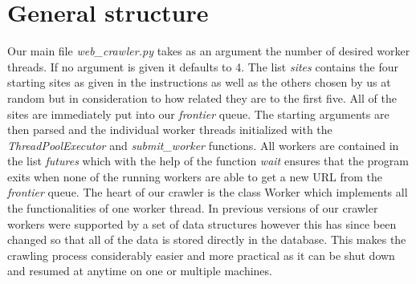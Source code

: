 \documentclass[runningheads]{llncs}
\begin{document}
\section{General structure}
Our main file \textit{web\_crawler.py} takes as an argument the number of desired worker threads. If no argument is given it defaults to 4. The list \textit{sites} contains the four starting sites as given in the instructions as well as the others chosen by us at random but in consideration to how related they are to the first five. All of the sites are immediately put into our \textit{frontier} queue. The starting arguments are then parsed and the individual worker threads initialized with the \textit{ThreadPoolExecutor} and \textit{submit\_worker} functions. All workers are contained in the list \textit{futures} which with the help of the function \textit{wait} ensures that the program exits when none of the running workers are able to get a new URL from the \textit{frontier} queue.
The heart of our crawler is the class Worker which implements all the functionalities of one worker thread. In previous versions of our crawler workers were supported by a set of data structures however this has since been changed so that all of the data is stored directly in the database. This makes the crawling process considerably easier and more practical as it can be shut down and resumed at anytime on one or multiple machines.
\end{document}
